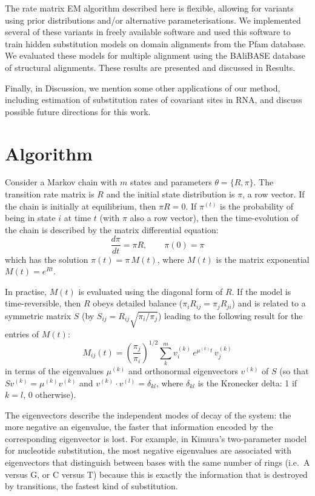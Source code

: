 \documentclass[12pt]{article}
\begin{document}
The rate matrix EM algorithm described here is flexible, allowing for variants using prior
distributions and/or alternative parameterisations. We implemented several of these variants in
freely available software and used this software to train hidden substitution models on domain
alignments from the Pfam database.\cite{Bateman2000} We evaluated these models for multiple
alignment using the BAliBASE database of structural alignments. These results are presented and
discussed in Results.

Finally, in Discussion, we mention some other applications of our method, including estimation of
substitution rates of covariant sites in RNA, and discuss possible future directions for this work.


\section{Algorithm}

Consider a Markov chain with $m$ states and parameters $\theta = \{R, \pi\}$. The transition rate
matrix is $R$ and the initial state distribution is $\pi$, a row vector. If the chain is initially
at equilibrium, then $\pi R = 0$. If $\pi^{(t)}$ is the probability of being in state $i$ at time
$t$ (with $\pi$ also a row vector), then the time-evolution of the chain is described by the matrix
differential equation:
\begin{equation*}
\frac{d\pi}{dt} = \pi R, \qquad \pi(0) = \pi
\end{equation*}
which has the solution $\pi(t) = \pi\, M(t)$, where $M(t)$ is the matrix exponential $M(t) = e^{Rt}$.

In practise, $M(t)$ is evaluated using the diagonal form of $R$. If the model is time-reversible,
then $R$ obeys detailed balance ($\pi_i R_{ij} = \pi_j R_{ji}$) and is related to a symmetric
matrix $S$ (by $S_{ij} = R_{ij} \sqrt{\pi_i / \pi_j}$) leading to the following result for the
entries of $M(t)$:
\begin{equation}
M_{ij}(t) = \left(\frac{\pi_j}{\pi_i}\right)^{1/2} \sum_{k}^{m} v_i^{(k)}\, e^{\mu^{(k)} t}\, v_j^{(k)}
\end{equation}
in terms of the eigenvalues $\mu^{(k)}$ and orthonormal eigenvectors $v^{(k)}$ of $S$ (so that
$S v^{(k)} = \mu^{(k)} v^{(k)}$ and $v^{(k)} \cdot v^{(l)} = \delta_{kl}$, where $\delta_{kl}$ is the
Kronecker delta: 1 if $k = l$, 0 otherwise).

The eigenvectors describe the independent modes of decay of the system: the more negative an
eigenvalue, the faster that information encoded by the corresponding eigenvector is lost. For
example, in Kimura's two-parameter model for nucleotide substitution,\cite{Kimura1980} the most
negative eigenvalues are associated with eigenvectors that distinguish between bases with the same
number of rings (i.e.\ A versus G, or C versus T) because this is exactly the information that is
destroyed by transitions, the fastest kind of substitution.
\end{document}
